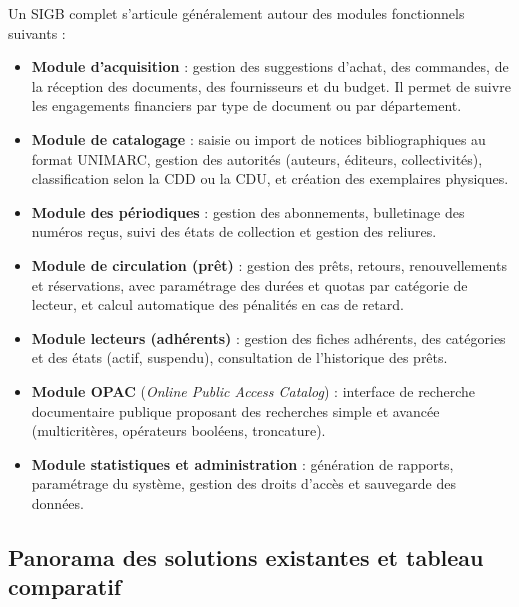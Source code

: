 Un SIGB complet s'articule généralement autour des modules fonctionnels
suivants 
:

\begin{itemize}
    \item \textbf{Module d'acquisition} : gestion des suggestions d'achat,
    des commandes, de la réception des documents, des fournisseurs et du budget.
    Il permet de suivre les engagements financiers par type de document ou
    par département.

    \item \textbf{Module de catalogage} : saisie ou import de notices
    bibliographiques au format UNIMARC, gestion des autorités (auteurs,
    éditeurs, collectivités), classification selon la CDD ou la CDU, et
    création des exemplaires physiques.

    \item \textbf{Module des périodiques} : gestion des abonnements,
    bulletinage des numéros reçus, suivi des états de collection et gestion
    des reliures.

    \item \textbf{Module de circulation (prêt)} : gestion des prêts, retours,
    renouvellements et réservations, avec paramétrage des durées et quotas
    par catégorie de lecteur, et calcul automatique des pénalités en cas de
    retard.

    \item \textbf{Module lecteurs (adhérents)} : gestion des fiches adhérents,
    des catégories et des états (actif, suspendu), consultation de l'historique
    des prêts.

    \item \textbf{Module OPAC} (\emph{Online Public Access Catalog}) :
    interface de recherche documentaire publique proposant des recherches
    simple et avancée (multicritères, opérateurs booléens, troncature).

    \item \textbf{Module statistiques et administration} : génération de
    rapports, paramétrage du système, gestion des droits d'accès et
    sauvegarde des données.
\end{itemize}

\subsection{Panorama des solutions existantes et tableau comparatif}
\label{sec:comparatif}

